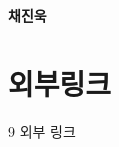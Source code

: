 \documentclass[12pt, a4paper, oneside]{book}
\let\stdsection\section
\renewcommand\section{\newpage\stdsection}
\begin{document}
\paragraph{채진욱}




	\section{ 외부링크}

9	외부 링크














\end{document}
